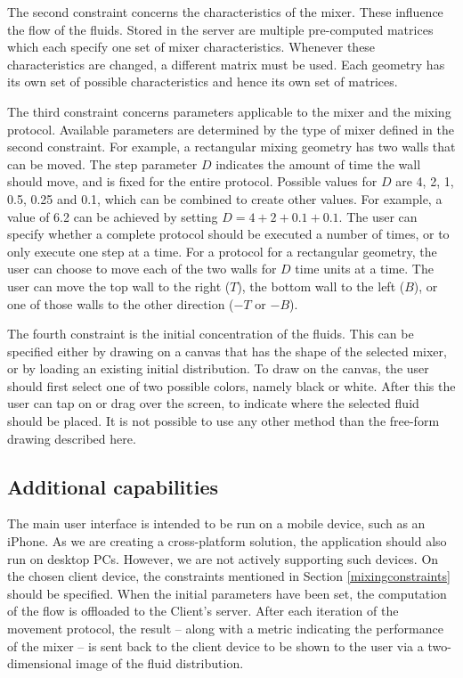 The second constraint concerns the characteristics of the mixer. These influence the flow of the fluids. Stored in the server are multiple pre-computed matrices which each specify one set of mixer characteristics. Whenever these characteristics are changed, a different matrix must be used. Each geometry has its own set of possible characteristics and hence its own set of matrices.

The third constraint concerns parameters applicable to the mixer and the mixing protocol. Available parameters are determined by the type of mixer defined in the second constraint. For example, a rectangular mixing geometry has two walls that can be moved. The step parameter $D$ indicates the amount of time the wall should move, and is fixed for the entire protocol. Possible values for $D$ are 4, 2, 1, 0.5, 0.25 and 0.1, which can be combined to create other values. For example, a value of 6.2 can be achieved by setting $D=4+2+0.1+0.1$. The user can specify whether a complete protocol should be executed a number of times, or to only execute one step at a time. For a protocol for a rectangular geometry, the user can choose to move each of the two walls for $D$ time units at a time. The user can move the top wall to the right ($T$), the bottom wall to the left ($B$), or one of those walls to the other direction ($-T$ or $-B$).

The fourth constraint is the initial concentration of the fluids. This can be specified either by drawing on a canvas that has the shape of the selected mixer, or by loading an existing initial distribution. To draw on the canvas, the user should first select one of two possible colors, namely black or white. After this the user can tap on or drag over the screen, to indicate where the selected fluid should be placed. It is not possible to use any other method than the free-form drawing described here.

\subsection{Additional capabilities}
The main user interface is intended to be run on a mobile device, such as an iPhone. As we are creating a cross-platform solution, the application should also run on desktop PCs. However, we are not actively supporting such devices. On the chosen client device, the constraints mentioned in Section \ref{mixingconstraints} should be specified. When the initial parameters have been set, the computation of the flow is offloaded to the Client's server. After each iteration of the movement protocol, the result -- along with a metric indicating the performance of the mixer -- is sent back to the client device to be shown to the user via a two-dimensional image of the fluid distribution.

